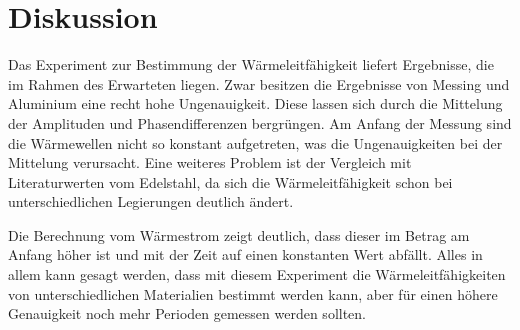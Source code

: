 \section{Diskussion}
\label{sec:Diskussion}
Das Experiment zur Bestimmung
der Wärmeleitfähigkeit liefert Ergebnisse,
die im Rahmen des Erwarteten liegen.
Zwar besitzen die Ergebnisse von Messing und Aluminium eine recht hohe
Ungenauigkeit. Diese lassen sich durch die Mittelung der Amplituden und
Phasendifferenzen bergrüngen. Am Anfang der Messung sind die Wärmewellen
nicht so konstant aufgetreten, was die Ungenauigkeiten bei der Mittelung
verursacht. Eine weiteres Problem ist der Vergleich mit Literaturwerten
vom Edelstahl, da sich die Wärmeleitfähigkeit schon bei unterschiedlichen
Legierungen deutlich ändert.

Die Berechnung vom Wärmestrom zeigt deutlich, dass dieser im Betrag
am Anfang höher ist und mit der Zeit auf einen konstanten Wert abfällt.
Alles in allem kann gesagt werden, dass mit diesem Experiment
die Wärmeleitfähigkeiten von unterschiedlichen Materialien bestimmt werden kann,
aber für einen höhere Genauigkeit noch mehr Perioden gemessen werden sollten.
